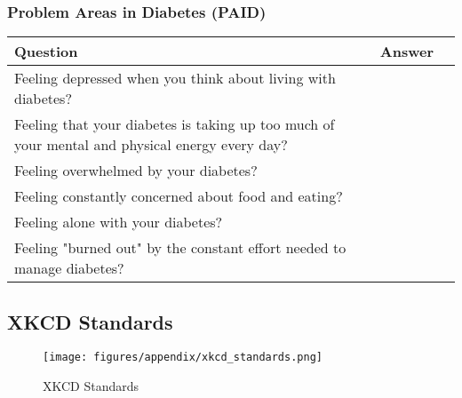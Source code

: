 \subsubsection{Problem Areas in Diabetes (PAID)}
\begin{table}[H]
    \centering
    \renewcommand{\arraystretch}{1.2}
    \begin{tabularx}{\textwidth}{|l|X|l|}
        \hline
        \textbf{Question} & \textbf{Answer} \\ \hline
        Feeling depressed when you think about living with diabetes? &  \\ \hline
        Feeling that your diabetes is taking up too much of your mental and physical energy every day? &  \\ \hline
        Feeling overwhelmed by your diabetes? &  \\ \hline
        Feeling constantly concerned about food and eating? &  \\ \hline
        Feeling alone with your diabetes? &  \\ \hline
        Feeling "burned out" by the constant effort needed to manage diabetes? &  \\ \hline
    \end{tabularx}
\end{table}


\subsection{XKCD Standards}
\begin{figure}[H]
    \centering
    \texttt{[image: figures/appendix/xkcd\_standards.png]}
    \caption{XKCD Standards ~\cite{XKCD-standards}}
    \label{fig:XKCD-standards}
\end{figure}
